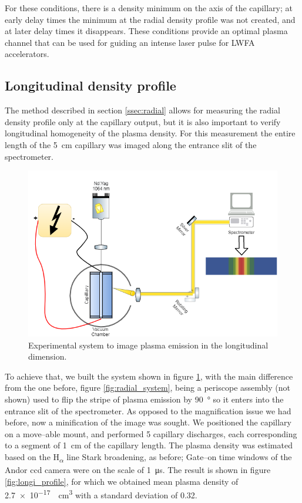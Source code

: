 \documentclass[justified,nofonts,nobib,openany]{tufte-book}
\begin{document}
For these conditions, there is a density minimum on the axis of the capillary; at early delay times the minimum at the radial density profile was not created, and at later delay times it disappears. These conditions provide an optimal plasma channel that can be used for guiding an intense laser pulse for LWFA accelerators.

\subsection{Longitudinal density profile}\label{ssec:longi}

The method described in section \ref{ssec:radial} allows for measuring the radial density profile only at the capillary output, but it is also important to verify longitudinal homogeneity of the plasma density. For this measurement the entire length of the \SI{5}{\cm} capillary was imaged along the entrance slit of the spectrometer.
\begin{figure}
    \centering
    \includegraphics[width=\textwidth]{figures/spectro/longitudinal_system.png}
    \caption{Experimental system to image plasma emission in the longitudinal dimension.}
    \label{fig:longi_system}
\end{figure}

To achieve that, we built the system shown in figure \ref{fig:longi_system}, with the main difference from the one before, figure \ref{fig:radial_system}, being a periscope assembly (not shown) used to flip the stripe of plasma emission by \SI{90}{\degree} so it enters into the entrance slit of the spectrometer. As opposed to the magnification issue we had before, now a minification of the image was sought. We positioned the capillary on a move--able mount, and performed 5 capillary discharges, each corresponding to a segment of \SI{1}{\cm} of the capillary length. The plasma density was estimated based on the H\textsubscript{$\alpha$} line Stark broadening, as before; Gate--on time windows of the Andor ccd camera were on the scale of \SI{1}{\us}. The result is shown in figure \ref{fig:longi_profile}, for which we obtained mean plasma density of \SI{2.7e-17}{\per\cubic\cm} with a standard deviation of 0.32.
\end{document}
